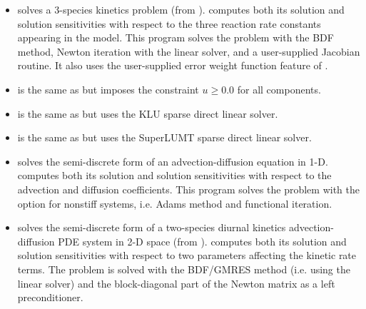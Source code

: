 \begin{itemize}

\item {}
  solves a 3-species kinetics problem (from ).
  \newline
  {\cvodes} computes both its solution and solution sensitivities with respect
  to the three reaction rate constants appearing in the model. 
  This program solves the problem with the BDF method, Newton          
  iteration with the {\cvdense} linear solver, and a user-supplied    
  Jacobian routine. It also uses the user-supplied error
  weight function feature of {\cvodes}.
\item {}
  is the same as  but imposes the constraint
  $u \geq 0.0$ for all components.
\item {}
  is the same as  but uses the KLU sparse direct linear solver.
\item {}
  is the same as  but uses the SuperLUMT sparse direct linear solver.
\item {}
  solves the semi-discrete form of an advection-diffusion equation in 1-D.
  \newline
  {\cvodes} computes both its solution and solution sensitivities with respect
  to the advection and diffusion coefficients.
  This program solves the problem with the option for nonstiff systems,
  i.e. Adams method and functional iteration.
\item {}
  solves the semi-discrete form of a two-species diurnal kinetics
  advection-diffusion PDE system in 2-D space (from ).
  \newline
  {\cvodes} computes both its solution and solution sensitivities with respect
  to two parameters affecting the kinetic rate terms.
  The problem is solved with the BDF/GMRES method (i.e. using the {\cvspgmr}
  linear solver) and the block-diagonal part of the  
  Newton matrix as a left preconditioner.



\end{itemize}
